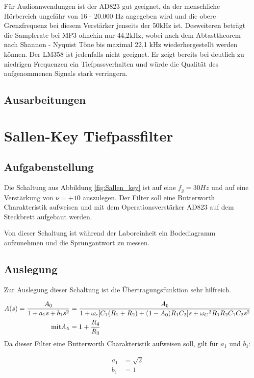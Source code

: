 Für Audioanwendungen ist der AD823 gut geeignet, da der menschliche Hörbereich ungefähr von 16 - 20.000 Hz angegeben wird und die obere Grenzfrequenz bei diesem Verstärker jenseits der 50kHz ist.  Desweiteren beträgt die Samplerate bei MP3 ohnehin nur 44,2kHz, wobei nach dem Abtasttheorem nach Shannon - Nyquist Töne bis maximal 22,1 kHz wiederhergestellt werden können. Der LM358 ist jedenfalls nicht geeignet. Er zeigt bereits bei deutlich zu niedrigen Frequenzen ein Tiefpassverhalten und würde die Qualität des aufgenommenen Signals stark verringern. 
\subsection{Ausarbeitungen}

\section{Sallen-Key Tiefpassfilter}
\subsection{Aufgabenstellung}
Die Schaltung aus Abbildung \ref{fig:Sallen_key} ist auf eine $f_g=30Hz$ und auf eine Verstärkung von $\nu = +10$ auszulegen. Der Filter soll eine Butterworth Charakteristik aufweisen und mit dem Operationsverstärker AD823 auf dem Steckbrett aufgebaut werden.

Von dieser Schaltung ist während der Laboreinheit ein Bodediagramm aufzunehmen und die Sprungantwort zu messen.


\subsection{Auslegung}
Zur Auslegung dieser Schaltung ist die Übertragungsfunktion sehr hilfreich.


\begin{align}
    A(s) = \frac{A_0}{1+a_1s + b_1s^2}&=\frac{A_0}{1+\omega_c[C_1(R_1+R_2) + (1-A_0)R_1C_2]s + {\omega_C}^2R_1R_2C_1C_2s^2} \\
    \rm mit \it A_0 &= 1+ \frac{R_4}{R_3}
\end{align}
Da dieser Filter eine Butterworth Charakteristik aufweisen soll, gilt für $a_1$ und $b_1$:

\begin{align}
    a_1 &= \sqrt{2} \\
    b_1 &= 1
\end{align}

